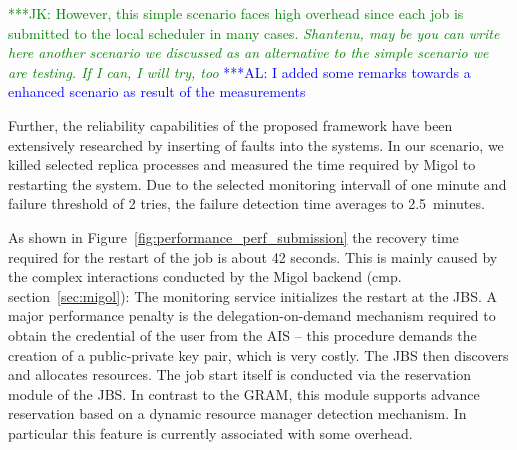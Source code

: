 \documentclass[times, 10pt, twocolumn]{article}
\newcommand{\kimnote}[1]{ {\textcolor{green} { ***JK: #1 }}}
\newcommand{\alnote}[1]{ {\textcolor{blue} { ***AL: #1 }}}
\newcommand{\kimnote}[1]{}
\newcommand{\alnote}[1]{}
\begin{document}
\kimnote{However, this simple scenario faces high overhead since each
  job is submitted to the local scheduler in many cases. \it
  Shantenu, may be you can write here another scenario we discussed
  as an alternative to the simple scenario we are testing.  If I can,
  I will try, too }            
\alnote{I added some remarks towards a enhanced scenario as result of the measurements}  

Further, the reliability capabilities of the proposed framework have
been extensively researched by inserting of faults into the
systems. In our scenario, we killed selected replica processes and
measured the time required by Migol to restarting the system.  Due to
the selected monitoring intervall of one minute and failure threshold
of 2 tries, the failure detection time averages to 2.5\, minutes.

As shown in Figure~\ref{fig:performance_perf_submission} the recovery
time required for the restart of the job is about 42 seconds. This is
mainly caused by the complex interactions conducted by the Migol
backend (cmp. section~\ref{sec:migol}): The monitoring service
initializes the restart at the JBS.  A major performance penalty is
the delegation-on-demand mechanism required to obtain the credential
of the user from the AIS -- this procedure demands the creation of a
public-private key pair, which is very costly. The JBS then discovers
and allocates resources.  The job start itself is conducted via the
reservation module of the JBS. In contrast to the GRAM, this module
supports advance reservation based on a dynamic resource manager detection
mechanism. In particular this feature is currently associated with 
some overhead.

\end{document}
